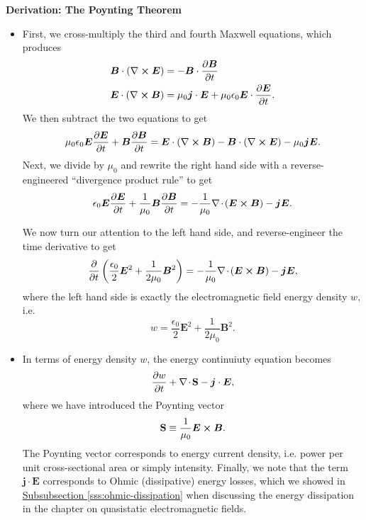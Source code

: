 \documentclass[11pt, a4paper]{article}
\newcommand{\Poy}{Poynting\xspace}
\renewcommand{\vec}[1]{\bm{#1}} %
\newcommand{\E}{\vec{E}} %
\newcommand{\B}{\vec{B}} %
\renewcommand{\S}{\mathbf{S}}  %
\newcommand{\ee}{\epsilon_{0}}  %
\newcommand{\mm}{\mu_{0}}  %
\renewcommand{\j}{\vec{j}}  %
\renewcommand{\div}{\nabla \mspace{-2mu} \cdot \mspace{-2mu}}
\renewcommand{\curl}{\nabla \cross}
\begin{document}
\textbf{Derivation: The Poynting Theorem}
\begin{itemize}
	\item First, we cross-multiply the third and fourth Maxwell equations, which produces
	\begin{align*}
		& \B \cdot (\curl \E) = - \B \cdot \pdv{\B}{t}\\
		& \E \cdot (\curl \B) = \mm \j \cdot \E + \mm \ee \E \cdot \pdv{\E}{t}.
	\end{align*}
	We then subtract the two equations to get
	\begin{equation*}
		\mm \ee \E \pdv{\E}{t} + \B \pdv{\B}{t} = \E\cdot(\curl \B) - \B\cdot(\curl \E) - \mm \j \E.
	\end{equation*}
	Next, we divide by $ \mm $ and rewrite the right hand side with a reverse-engineered ``divergence product rule'' to get
	\begin{equation*}
		\ee \E \pdv{\E}{t} + \frac{1}{\mm}\B \pdv{\B}{t} = - \frac{1}{\mm}\div(\E\cross\B) - \j \E.
	\end{equation*}

	We now turn our attention to the left hand side, and reverse-engineer the time derivative to get
	\begin{equation*}
		\pdv{t}\left(\frac{\ee}{2} \E^{2} + \frac{1}{2\mm}\B^{2}\right) = - \frac{1}{\mm}\div(\E\cross\B) - \j \E,
	\end{equation*}
	where the left hand side is exactly the electromagnetic field energy density $ w $, i.e.
	\begin{equation*}
		w = \frac{\ee}{2} \E^{2} + \frac{1}{2\mm}\B^{2}.
	\end{equation*}
	
	\item In terms of energy density $ w $, the energy continuiuty equation becomes
	\begin{equation*}
		\pdv{w}{t} + \div \S - \j \cdot \E,
	\end{equation*}
    where we have introduced the \Poy vector
	\begin{equation*}
		\S \equiv \frac{1}{\mm}\E \cross \B.
	\end{equation*}
	The \Poy vector corresponds to energy current density, i.e. power per unit cross-sectional area or simply intensity. Finally, we note that the term $ \j \cdot \E $ corresponds to Ohmic (dissipative) energy losses, which we showed in \hyperref[sss:ohmic-dissipation]{\underline{Subsubsection \ref{sss:ohmic-dissipation}}} when discussing the energy dissipation in the chapter on quasistatic electromagnetic fields.
	

\end{itemize}
\end{document}
